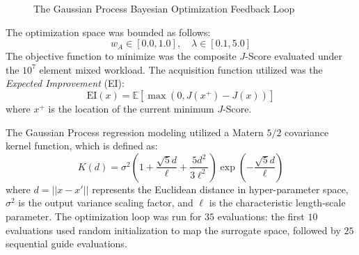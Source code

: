 \begin{figure}[H]
\centering
{}
\caption{The Gaussian Process Bayesian Optimization Feedback Loop}
\label{fig:bo_feedback_loop}
\end{figure}

The optimization space was bounded as follows:
\begin{equation}
    w_A \in [0.0, 1.0], \quad \lambda \in [0.1, 5.0]
\end{equation}
The objective function to minimize was the composite $J$-Score evaluated under 
the $10^7$ element mixed workload. The acquisition function utilized was the 
\textit{Expected Improvement} (EI):
\begin{equation}
    \text{EI}(x) = \mathbb{E} \left[ \max(0, J(x^+) - J(x)) \right]
\end{equation}
where $x^+$ is the location of the current minimum $J$-Score. 

The Gaussian Process regression modeling utilized a Matern $5/2$ covariance 
kernel function, which is defined as:
\begin{equation}
    K(d) = \sigma^2 \left( 1 + \frac{\sqrt{5}d}{\ell} + \frac{5d^2}{3\ell^2} \right) \exp\left(-\frac{\sqrt{5}d}{\ell}\right)
\end{equation}
where $d = ||x - x'||$ represents the Euclidean distance in hyper-parameter space, 
$\sigma^2$ is the output variance scaling factor, and $\ell$ is the characteristic 
length-scale parameter. The optimization loop was run for $35$ evaluations: the first 
$10$ evaluations used random initialization to map the surrogate space, followed by 
$25$ sequential guide evaluations.

